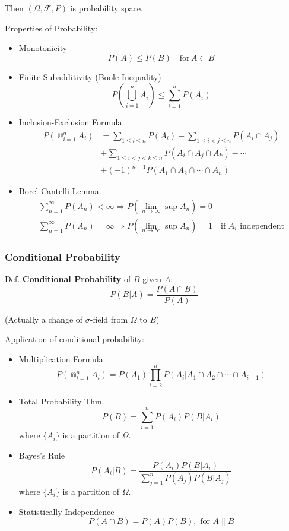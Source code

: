     Then $(\Omega,\mathscr{F},P)$ is probability space.

    Properties of Probability:
    \begin{itemize}
        \item Monotonicity
        \[
            P(A)\leq P(B)\quad \text{for}\, A\subset B
        \]
        \item Finite Subadditivity (Boole Inequality)
        \[
            P(\bigcup_{i=1}^nA_i)\leq\sum_{i=1}^n P(A_i)    
        \]
        \item Inclusion-Exclusion Formula
        \begin{align*}
            P(\Cup_{i=1}^nA_i)&=\sum_{1\leq i\leq n}P(A_i)-\sum_{1\leq i<j\leq n}P(A_i\cap A_j)\\
            &+\sum_{1\leq i<j<k\leq n}P(A_i\cap A_j\cap A_k)-\cdots\\
            &+(-1)^{n-1}P(A_1 \cap A_2\cap\cdots \cap A_n)
        \end{align*}
        \item Borel-Cantelli Lemma
        \begin{gather*}
            \sum_{n=1}^\infty P(A_n)<\infty\Rightarrow P(\lim_{n\to\infty}\sup A_n)=0\\
            \sum_{n=1}^\infty P(A_n)=\infty\Rightarrow P(\lim_{n\to\infty}\sup A_n)=1\quad \text{if }A_i\text{ independent}
        \end{gather*}
    \end{itemize}


\subsubsection{Conditional Probability}
        Def. \textbf{Conditional Probability} of $B$ given $A$:
        \[
            P(B|A)=\frac{P(A\cap B)}{P(A)}    
        \]

        (Actually a change of $\sigma$-field from $\Omega$ to $B$)

        Application of conditional probability:
        \begin{itemize}
        \item Multiplication Formula
        \[
            P(\Cap_{i=1}^n A_i)=P(A_1)\prod_{i=2}^n P(A_i|A_1\cap A_2\cap \cdots\cap A_{i-1})    
        \]
        \item Total Probability Thm.
        \[
            P(B)=\sum_{i=1}^n P(A_i)P(B|A_i)  
        \]
        where $\{A_i\}$ is a partition of $\Omega$.
        \item Bayes's Rule
        \[
            P(A_i|B)=\frac{P(A_i)P(B|A_i)}{\sum_{j=1}^nP(A_j)P(B|A_j)}    
        \]
        where $\{A_i\}$ is a partition of $\Omega$.
        \item Statistically Independence
        \[
            P(A\cap B) =P(A)P(B),\text{ for }A\parallel B
        \]
    \end{itemize}

